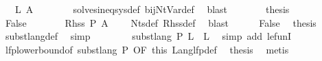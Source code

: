 \begin{isabellebody}
\ {\isachardoublequoteopen}{\isasymdots}\ {\isasymsubseteq}\ {\isacharquery}{\kern0pt}L{\isacharprime}{\kern0pt}\ A{\isachardoublequoteclose}\isanewline
\ \ \ \ \ \ \isamarkupfalse%
\ solves{\isacharunderscore}{\kern0pt}ineq{\isacharunderscore}{\kern0pt}sys{\isacharunderscore}{\kern0pt}def\ bij{\isacharunderscore}{\kern0pt}Nt{\isacharunderscore}{\kern0pt}Var{\isacharunderscore}{\kern0pt}def\ \isamarkupfalse%
\ blast\isanewline
\ \ \ \ \isamarkupfalse%
\ \isamarkupfalse%
\ {\isacharquery}{\kern0pt}thesis\ \isakeywordONE{{\isachardot}{\kern0pt}}\isamarkupfalse%
\isanewline
\ \ \isamarkupfalse%
\isanewline
\ \ \ \ \isamarkupfalse%
\ False\isanewline
\ \ \ \ \isamarkupfalse%
\ \isamarkupfalse%
\ {\isachardoublequoteopen}Rhss\ P\ A\ {\isacharequal}{\kern0pt}\ {\isacharbraceleft}{\kern0pt}{\isacharbraceright}{\kern0pt}{\isachardoublequoteclose}\ \isamarkupfalse%
\ Nts{\isacharunderscore}{\kern0pt}def\ Rhss{\isacharunderscore}{\kern0pt}def\ \isamarkupfalse%
\ blast\isanewline
\ \ \ \ \isamarkupfalse%
\ False\ \isamarkupfalse%
\ {\isacharquery}{\kern0pt}thesis\ \isamarkupfalse%
\ subst{\isacharunderscore}{\kern0pt}lang{\isacharunderscore}{\kern0pt}def\ \isamarkupfalse%
\ simp\isanewline
\ \ \isamarkupfalse%
\isanewline
\ \ \isamarkupfalse%
\ \isamarkupfalse%
\ {\isachardoublequoteopen}subst{\isacharunderscore}{\kern0pt}lang\ P\ {\isacharquery}{\kern0pt}L{\isacharprime}{\kern0pt}\ {\isasymle}\ {\isacharquery}{\kern0pt}L{\isacharprime}{\kern0pt}{\isachardoublequoteclose}\ \isamarkupfalse%
\ {\isacharparenleft}{\kern0pt}simp\ add{\isacharcolon}{\kern0pt}\ le{\isacharunderscore}{\kern0pt}funI{\isacharparenright}{\kern0pt}\isanewline
\ \ \isamarkupfalse%
\ lfp{\isacharunderscore}{\kern0pt}lowerbound{\isacharbrackleft}{\kern0pt}of\ {\isachardoublequoteopen}subst{\isacharunderscore}{\kern0pt}lang\ P{\isachardoublequoteclose}{\isacharcomma}{\kern0pt}\ OF\ this{\isacharbrackright}{\kern0pt}\ Lang{\isacharunderscore}{\kern0pt}lfp{\isacharunderscore}{\kern0pt}def\ \isamarkupfalse%
\ {\isacharquery}{\kern0pt}thesis\ \isamarkupfalse%
\ metis\isanewline
{}\isamarkupfalse%
%
\endisatagproof
{\isafoldproof}%
%
\isadelimproof
\isanewline

\end{isabellebody}
